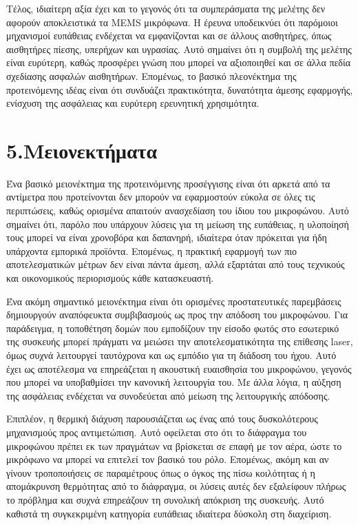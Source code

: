 \documentclass[12pt,a4paper]{report}
\begin{document}
	Τέλος, ιδιαίτερη αξία έχει και το γεγονός ότι τα συμπεράσματα της μελέτης δεν αφορούν αποκλειστικά τα MEMS μικρόφωνα. Η έρευνα υποδεικνύει ότι παρόμοιοι μηχανισμοί ευπάθειας ενδέχεται να εμφανίζονται και σε άλλους αισθητήρες, όπως αισθητήρες πίεσης, υπερήχων και υγρασίας. Αυτό σημαίνει ότι η συμβολή της μελέτης είναι ευρύτερη, καθώς προσφέρει γνώση που μπορεί να αξιοποιηθεί και σε άλλα πεδία σχεδίασης ασφαλών αισθητήρων. Επομένως, το βασικό πλεονέκτημα της προτεινόμενης ιδέας είναι ότι συνδυάζει πρακτικότητα, δυνατότητα άμεσης εφαρμογής, ενίσχυση της ασφάλειας και ευρύτερη ερευνητική χρησιμότητα.
	
	\chapter*{5.Μειονεκτήματα }
	Ένα βασικό μειονέκτημα της προτεινόμενης προσέγγισης είναι ότι αρκετά από τα αντίμετρα που προτείνονται δεν μπορούν να εφαρμοστούν εύκολα σε όλες τις περιπτώσεις, καθώς ορισμένα απαιτούν ανασχεδίαση του ίδιου του μικροφώνου. Αυτό σημαίνει ότι, παρόλο που υπάρχουν λύσεις για τη μείωση της ευπάθειας, η υλοποίησή τους μπορεί να είναι χρονοβόρα και δαπανηρή, ιδιαίτερα όταν πρόκειται για ήδη υπάρχοντα εμπορικά προϊόντα. Επομένως, η πρακτική εφαρμογή των πιο αποτελεσματικών μέτρων δεν είναι πάντα άμεση, αλλά εξαρτάται από τους τεχνικούς και οικονομικούς περιορισμούς κάθε κατασκευαστή.
	
	Ένα ακόμη σημαντικό μειονέκτημα είναι ότι ορισμένες προστατευτικές παρεμβάσεις δημιουργούν αναπόφευκτα συμβιβασμούς ως προς την απόδοση του μικροφώνου. Για παράδειγμα, η τοποθέτηση δομών που εμποδίζουν την είσοδο φωτός στο εσωτερικό της συσκευής μπορεί πράγματι να μειώσει την αποτελεσματικότητα της επίθεσης laser, όμως συχνά λειτουργεί ταυτόχρονα και ως εμπόδιο για τη διάδοση του ήχου. Αυτό έχει ως αποτέλεσμα να επηρεάζεται η ακουστική ευαισθησία του μικροφώνου, γεγονός που μπορεί να υποβαθμίσει την κανονική λειτουργία του. Με άλλα λόγια, η αύξηση της ασφάλειας ενδέχεται να συνοδεύεται από μείωση της λειτουργικής απόδοσης.
	
	Επιπλέον, η θερμική διάχυση παρουσιάζεται ως ένας από τους δυσκολότερους μηχανισμούς προς αντιμετώπιση. Αυτό οφείλεται στο ότι το διάφραγμα του μικροφώνου πρέπει εκ των πραγμάτων να βρίσκεται σε επαφή με τον αέρα, ώστε το μικρόφωνο να μπορεί να επιτελεί τον βασικό του ρόλο. Επομένως, ακόμη και αν γίνουν τροποποιήσεις σε παραμέτρους όπως ο όγκος της πίσω κοιλότητας ή η απομάκρυνση θερμότητας από το διάφραγμα, οι λύσεις αυτές δεν εξαλείφουν πλήρως το πρόβλημα και συχνά επηρεάζουν τη συνολική απόκριση της συσκευής. Αυτό καθιστά τη συγκεκριμένη κατηγορία ευπάθειας ιδιαίτερα δύσκολη στη διαχείριση.
	
\end{document}
